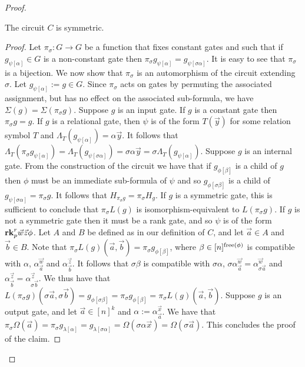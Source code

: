 \documentclass[../paper.tex]{subfiles}
\begin{document}
\begin{proof}
\begin{claim}
  The circuit $C$ is symmetric.
\end{claim}
\begin{proof}
  Let $\pi_\sigma : G \rightarrow G$ be a function that fixes constant gates and
  such that if $g_{\psi[\alpha]} \in G$ is a non-constant gate then
  $\pi_{\sigma} g_{\psi [\alpha]} = g_{\psi[\sigma \alpha]}$. It is easy to see
  that $\pi_\sigma$ is a bijection. We now show that $\pi_{\sigma}$ is an
  automorphism of the circuit extending $\sigma$. Let $g_{\psi[\alpha]} := g \in
  G$. Since $\pi_{\sigma}$ acts on gates by permuting the associated assignment,
  but has no effect on the associated sub-formula, we have $\Sigma(g) = \Sigma
  (\pi_{\sigma} g)$. Suppose $g$ is an input gate. If $g$ is a constant gate
  then $\pi_\sigma g = g$. If $g$ is a relational gate, then $\psi$ is of the
  form $T(\vec{y})$ for some relation symbol $T$ and $\Lambda_T
  (g_{\psi[\alpha]}) = \alpha \vec{y}$. It follows that $\Lambda_T (\pi_{\sigma}
  g_{\psi[\alpha]}) = \Lambda_T( g_{\psi[\sigma \alpha]}) = \sigma \alpha
  \vec{y} = \sigma \Lambda_T (g_{\psi[\alpha]})$. Suppose $g$ is an internal
  gate. From the construction of the circuit we have that if $g_{\phi[\beta]}$
  is a child of $g$ then $\phi$ must be an immediate sub-formula of $\psi$ and
  so $g_{\phi[\sigma \beta]}$ is a child of $g_{\psi[\sigma \alpha]} =
  \pi_{\sigma} g$. It follows that $H_{\pi_\sigma g} = \pi_\sigma H_g$. If $g$
  is a symmetric gate, this is sufficient to conclude that $\pi_{\sigma} L(g)$
  is isomorphism-equivalent to $L(\pi_{\sigma} g)$. If $g$ is not a symmetric
  gate then it must be a rank gate, and so $\psi$ is of the form $\text{\textbf{rk}}^r_p
  \vec{w} \vec{z} \phi$. Let $A$ and $B$ be defined as in our definition of $C$,
  and let $\vec{a} \in A$ and $\vec{b} \in B$. Note that $\pi_\sigma L(g)
  (\vec{a}, \vec{b}) = \pi_{\sigma} g_{\phi[\beta]}$, where $\beta \in
  [n]^{\mathrm{free}(\phi)}$ is compatible with $\alpha$, $\alpha^{\vec{w}}_{\vec{a}}$
  and $\alpha^{\vec{z}}_{\vec{b}}$. It follows that $\sigma \beta$ is compatible
  with $\sigma \alpha$, $\sigma \alpha^{\vec{w}}_{\vec{a}} =
  \alpha^{\vec{w}}_{\sigma \vec{a}}$ and $\alpha^{\vec{z}}_{\vec{b}} =
  \alpha^{\vec{z}}_{\sigma \vec{b}}$. We thus have that $L(\pi_{\sigma}
  g)(\sigma \vec{a}, \sigma \vec{b}) = g_{\phi[\sigma \beta]} = \pi_{\sigma}
  g_{\phi[\beta]} = \pi_{\sigma} L(g)(\vec{a}, \vec{b})$. Suppose $g$ is an
  output gate, and let $\vec{a} \in [n]^k$ and $\alpha :=
  \alpha^{\vec{x}}_{\vec{a}}$. We have that $\pi_{\sigma} \Omega (\vec{a}) =
  \pi_\sigma g_{\lambda[\alpha]} = g_{\lambda[\sigma \alpha]} = \Omega (\sigma
  \alpha \vec{x}) = \Omega (\sigma \vec{a})$. This concludes the proof of the
  claim.
\end{proof}
  

\end{proof}
\end{document}
